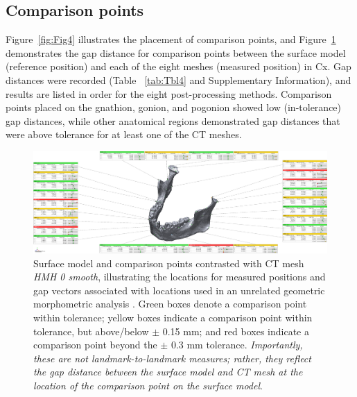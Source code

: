 \documentclass[review]{elsarticle}
\begin{document}
\subsection*{Comparison points}
Figure~\ref{fig:Fig4} illustrates the placement of comparison points, and Figure~\ref{fig:Fig5} demonstrates the gap distance for comparison points between the surface model (reference position) and each of the eight meshes (measured position) in Cx. Gap distances were recorded (Table ~\ref{tab:Tbl4} and Supplementary Information), and results are listed in order for the eight post-processing methods. Comparison points placed on the gnathion, gonion, and pogonion showed low (in-tolerance) gap distances, while other anatomical regions demonstrated gap distances that were above tolerance for at least one of the CT meshes.

\begin{figure}[ht]\centering
\includegraphics[width=\linewidth]{Fig5}
\caption{Surface model and comparison points contrasted with CT mesh \textit{HMH 0 smooth}, illustrating the locations for measured positions and gap vectors associated with locations used in an unrelated geometric morphometric analysis \cite[Supplementary Information]{RN11477}. Green boxes denote a comparison point within tolerance; yellow boxes indicate a comparison point within tolerance, but above/below $\pm$ 0.15 mm; and red boxes indicate a comparison point beyond the $\pm$ 0.3 mm tolerance. \textit{Importantly, these are not landmark-to-landmark measures; rather, they reflect the gap distance between the surface model and CT mesh at the location of the comparison point on the surface model}.}
\label{fig:Fig5}
\end{figure}
\end{document}
